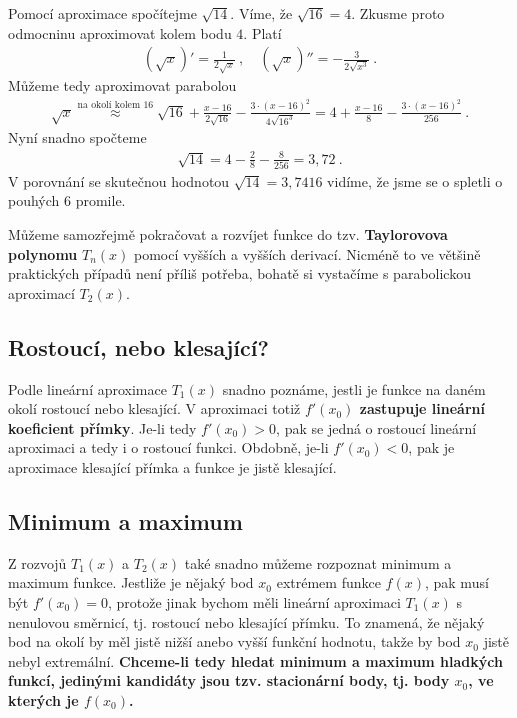 \begin{example}
    Pomocí aproximace spočítejme $\sqrt{14}$. Víme, že $\sqrt{16} = 4$. Zkusme proto odmocninu aproximovat kolem bodu $4$. Platí \begin{align}
        (\sqrt{x})' = \frac{1}{2 \sqrt{x}} \:, \quad (\sqrt{x} )'' = -\frac{3}{2 \sqrt{x^3}} \:.
    \end{align}
    Můžeme tedy aproximovat parabolou \begin{align}
        \sqrt{x} \overset{\text{na okolí kolem }16} \approx \sqrt{16} + \frac{x-16}{2 \sqrt{16}}  -\frac{3\cdot(x-16)^2}{4 \sqrt{16^3}} = 4 + \frac{x-16}{8} - \frac{3\cdot(x-16)^2}{256}\:.
    \end{align}
    Nyní snadno spočteme \begin{align}
        \sqrt{14} = 4 - \frac{2}{8} - \frac{8}{256} = 3,72 \:.
    \end{align}
    V porovnání se skutečnou hodnotou $\sqrt{14} = 3,7416$ vidíme, že jsme se o spletli o pouhých $6$ promile.
\end{example}

Můžeme samozřejmě pokračovat a rozvíjet funkce do tzv. \textbf{Taylorovova polynomu} $T_n(x)$ pomocí vyšších a vyšších derivací. Nicméně to ve většině praktických případů není příliš potřeba, bohatě si vystačíme s parabolickou aproximací $T_2(x)$.

\subsection{Rostoucí, nebo klesající?}

Podle lineární aproximace $T_1(x)$ snadno poznáme, jestli je funkce na daném okolí rostoucí nebo klesající. V aproximaci totiž \textbf{$f'(x_0)$ zastupuje lineární koeficient přímky}. Je-li tedy $f'(x_0)>0$, pak se jedná o rostoucí lineární aproximaci a tedy i o rostoucí funkci. Obdobně, je-li $f'(x_0) <0$, pak je aproximace klesající přímka a funkce je jistě klesající.

\subsection{Minimum a maximum}

Z rozvojů $T_1(x)$ a $T_2(x)$ také snadno můžeme rozpoznat minimum a maximum funkce. 
Jestliže je nějaký bod $x_0$ extrémem funkce $f(x)$, pak musí být $f'(x_0)=0$, protože jinak bychom měli lineární aproximaci $T_1(x)$ s nenulovou směrnicí, tj. rostoucí nebo klesající přímku. To znamená, že nějaký bod na okolí by měl jistě nižší anebo vyšší funkční hodnotu, takže by bod $x_0$ jistě nebyl extremální. \textbf{Chceme-li tedy hledat minimum a maximum hladkých funkcí, jedinými kandidáty jsou tzv. stacionární body, tj. body $x_0$, ve kterých je $f(x_0)$.} 

